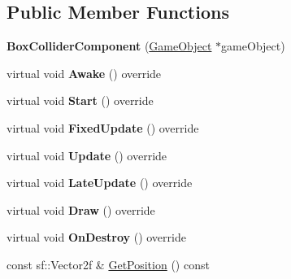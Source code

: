\subsection*{Public Member Functions}
\begin{DoxyCompactItemize}
\item 
\mbox{\label{classrvl_1_1_box_collider_component_ab5c7b15e465a239c2215943147ca9684}} 
{\bfseries Box\+Collider\+Component} (\hyperlink{classrvl_1_1_game_object}{Game\+Object} $\ast$game\+Object)
\item 
\mbox{\label{classrvl_1_1_box_collider_component_a9d24fb60cd1146699f9ca4520054ecca}} 
virtual void {\bfseries Awake} () override
\item 
\mbox{\label{classrvl_1_1_box_collider_component_afe7783e39128acea05634d4a8f27b4f9}} 
virtual void {\bfseries Start} () override
\item 
\mbox{\label{classrvl_1_1_box_collider_component_ab32e32943023482950da6626285f3518}} 
virtual void {\bfseries Fixed\+Update} () override
\item 
\mbox{\label{classrvl_1_1_box_collider_component_ada1f2c220918ef9c2d78930dce35f893}} 
virtual void {\bfseries Update} () override
\item 
\mbox{\label{classrvl_1_1_box_collider_component_aead041728c15fc3f138ea7f369f30084}} 
virtual void {\bfseries Late\+Update} () override
\item 
\mbox{\label{classrvl_1_1_box_collider_component_a2d126f4215dcf46afee101fa914dfb72}} 
virtual void {\bfseries Draw} () override
\item 
\mbox{\label{classrvl_1_1_box_collider_component_aba29d3e4f9c2f893dbde94ef26a808a3}} 
virtual void {\bfseries On\+Destroy} () override
\item 
const sf\+::\+Vector2f \& \hyperlink{classrvl_1_1_box_collider_component_af3f0eb3154ab12ca6e2b99ed8a6b47b0}{Get\+Position} () const

\end{DoxyCompactItemize}
